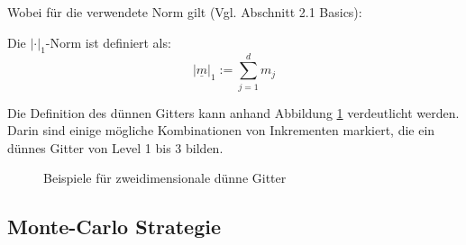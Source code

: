 \documentclass[a4paper,12pt]{llncs}
\numberwithin{equation}{section}
\begin{document}
Wobei für die verwendete Norm gilt (Vgl. \cite{P10} Abschnitt 2.1 Basics):

\begin{definition}
Die  $|\cdot|_1$-Norm ist definiert als:
	\begin{equation}
	|\underline{m}|_1:=\sum_{j=1}^d m_j
	\end{equation}
\end{definition}


Die Definition des dünnen Gitters kann anhand Abbildung \ref{fig:gitter03} verdeutlicht werden. Darin sind einige mögliche Kombinationen von Inkrementen markiert, die ein dünnes Gitter von Level 1 bis 3 bilden.

\begin{figure}
	\caption{Beispiele für zweidimensionale dünne Gitter}
	\label{fig:gitter03}
\end{figure}



\subsection{Monte-Carlo Strategie}
\end{document}
